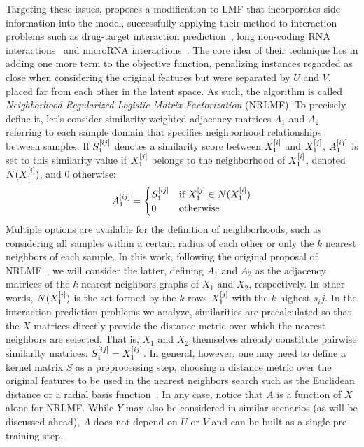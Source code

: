 Targeting these issues, \textcite{liu2016neighborhood,liu2017lpinrlmf,liu2020predicting} proposes a modification to LMF that incorporates side information into the model, successfully applying their method to interaction problems such as drug-target interaction prediction~\cite{liu2016neighborhood}, long non-coding RNA interactions~\cite{liu2017lpinrlmf} and microRNA interactions~\cite{liu2020predicting}.
%
The core idea of their technique lies in adding one more term to the objective function, penalizing instances regarded as close when considering the original features but were separated by $U$ and $V$, placed far from each other in the latent space. As such, the algorithm is called \emph{Neighborhood-Regularized Logistic Matrix Factorization} (NRLMF).
%
To precisely define it, let's consider similarity-weighted adjacency matrices $A_1$ and $A_2$ referring to each sample domain that specifies neighborhood relationships between samples. If $S_1^{[ij]}$ denotes a similarity score between $X_1^{[i]}$ and $X_1^{[j]}$, $A_1^{[ij]}$ is set to this similarity value if $X_1^{[j]}$ belongs to the neighborhood of $X_1^{[i]}$, denoted $N(X_1^{[i]})$, and 0 otherwise:
%
\begin{equation}
    A_1^{[ij]} =
    \begin{cases}
        S_1^{[ij]} & \text{if } X_1^{[j]} \in N(X_1^{[i]})\\
        0 & \text{otherwise}
    \end{cases}
    \label{eq:nrlmf_A}
\end{equation}
%
Multiple options are available for the definition of neighborhoods, such as considering all samples within a certain radius of each other or only the $k$ nearest neighbors of each sample. In this work, following the original proposal of NRLMF~\cite{liu2016neighborhood}, we will consider the latter, defining $A_1$ and $A_2$ as the adjacency matrices of the $k$-nearest neighbors graphs of $X_1$ and $X_2$, respectively. In other words, $N(X_1^{[i]})$ is the set formed by the $k$ rows $X_1^{[j]}$ with the $k$ highest $s_ij$. In the interaction prediction problems we analyze, similarities are precalculated so that the $X$ matrices directly provide the distance metric over which the nearest neighbors are selected. That is, $X_1$ and $X_2$ themselves already constitute pairwise similarity matrices: $S_1^{[ij]} = X_1^{[ij]}$. In general, however, one may need to define a kernel matrix $S$ as a preprocessing step, choosing a distance metric over the original features to be used in the nearest neighbors search such as the Euclidean distance or a radial basis function~\cite{vanlaarhoven2011gaussian}. In any case, notice that $A$ is a function of $X$ alone for NRLMF. While $Y$ may also be considered in similar scenarios (as will be discussed ahead), $A$ does not depend on $U$ or $V$ and can be built as a single pre-training step.

